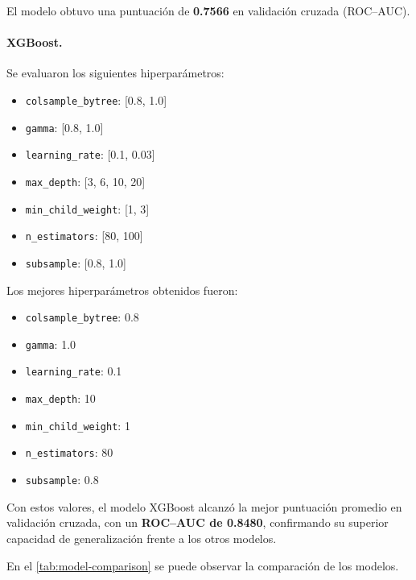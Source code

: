 \documentclass[12pt]{article}
\begin{document}
El modelo obtuvo una puntuación de \textbf{0.7566} en validación cruzada (ROC–AUC).

\paragraph{XGBoost.}
Se evaluaron los siguientes hiperparámetros:

\begin{itemize}
    \item \texttt{colsample\_bytree}: [0.8, 1.0]
    \item \texttt{gamma}: [0.8, 1.0]
    \item \texttt{learning\_rate}: [0.1, 0.03]
    \item \texttt{max\_depth}: [3, 6, 10, 20]
    \item \texttt{min\_child\_weight}: [1, 3]
    \item \texttt{n\_estimators}: [80, 100]
    \item \texttt{subsample}: [0.8, 1.0]
\end{itemize}

Los mejores hiperparámetros obtenidos fueron:

\begin{itemize}
    \item \texttt{colsample\_bytree}: 0.8
    \item \texttt{gamma}: 1.0
    \item \texttt{learning\_rate}: 0.1
    \item \texttt{max\_depth}: 10
    \item \texttt{min\_child\_weight}: 1
    \item \texttt{n\_estimators}: 80
    \item \texttt{subsample}: 0.8
\end{itemize}

Con estos valores, el modelo XGBoost alcanzó la mejor puntuación promedio en validación cruzada, con un \textbf{ROC–AUC de 0.8480}, confirmando su superior capacidad de generalización frente a los otros modelos.

En el \autoref{tab:model-comparison} se puede observar la comparación de los modelos.
\end{document}
